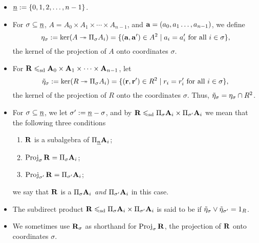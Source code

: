 \begin{itemize}
\item $\underline{n} :=\{0, 1, 2, \dots, n-1\}$.
\item For $\sigma \subseteq \underline{n} $, 
  $A = A_0 \times A_1 \times \cdots \times A_{n-1}$,
  and $\mathbf{a} = (a_0, a_1\dots, a_{n-1})$, we define
  \[
  \eta_\sigma := \ker(A \twoheadrightarrow \Pi_\sigma A_i) = \{(\mathbf{a}, \mathbf{a}') \in A^2 \mid
  a_i = a_i' \text{ for all } i \in \sigma\},
  \]
  the kernel of the projection of $A$ onto coordinates $\sigma$.
\item For
  $\mathbf{R} \leqslant_{\mathrm{sd}} \mathbf{A}_0 \times \mathbf{A}_1 \times \cdots \times \mathbf{A}_{n-1}$, let 
  \[
  \tilde{\eta}_\sigma := \ker(R \twoheadrightarrow \Pi_\sigma A_i) = \{(\mathbf{r}, \mathbf{r}') \in R^2 \mid
  r_i = r_i' \text{ for all } i \in \sigma\},
  \]
  the kernel of the projection of $R$ onto the coordinates $\sigma$. Thus,
  $\tilde{\eta}_\sigma = \eta_\sigma \cap R^2$.  

\item For $\sigma\subseteq \underline{n}$, we let $\sigma' := \underline{n} -\sigma$, and by
  $\mathbf{R} \leqslant_{\mathrm{sd}} \Pi_\sigma \mathbf{A}_i \times \Pi_{\sigma'}\mathbf{A}_i$ we 
  mean that the following three conditions 
  \begin{enumerate}
  \item $\mathbf{R}$ is a subalgebra of $\Pi_{\underline{n}} \mathbf{A}_i$;
  \item $\operatorname{Proj}_\sigma\mathbf{R} = \Pi_\sigma \mathbf{A}_i$;
  \item $\operatorname{Proj}_{\sigma'}\mathbf{R} = \Pi_{\sigma'} \mathbf{A}_i$;
  \end{enumerate}
  we say that $\mathbf{R}$ is a  
  $\Pi_\sigma \mathbf{A}_i$ \emph{and} $\Pi_{\sigma'}\mathbf{A}_i$ in this case.
\item 
  The subdirect product $\mathbf{R} \leqslant_{\mathrm{sd}} \Pi_\sigma \mathbf{A}_i \times
  \Pi_{\sigma'}\mathbf{A}_i$ 
  is said to be  if $\tilde{\eta}_\sigma \vee \tilde{\eta}_{\sigma'} = 1_R$.
\item We sometimes use $\mathbf{R}_\sigma$ as shorthand for $\operatorname{Proj}_\sigma\mathbf{R}$, the projection 
  of $\mathbf{R}$ onto coordinates $\sigma$.

\end{itemize}


